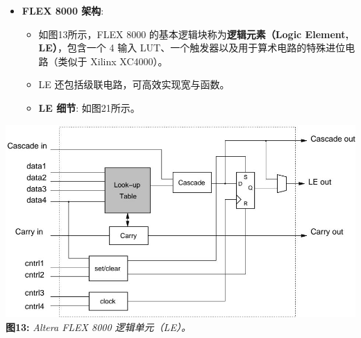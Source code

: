 \begin{frame}
\begin{itemize}
\tightlist
\item
    \textbf{FLEX 8000 架构}:

    \begin{itemize}
    \tightlist
    \item
    如图13所示，FLEX 8000 的基本逻辑块称为\textbf{逻辑元素（Logic
    Element, LE）}，包含一个 4 输入
    LUT、一个触发器以及用于算术电路的特殊进位电路（类似于 Xilinx
    XC4000）。
    \item
    LE 还包括级联电路，可高效实现宽与函数。
    \item
    \textbf{LE 细节}: 如图21所示。
    \end{itemize}
\end{itemize}

\includegraphics[keepaspectratio]{img1/FLEX800LE.jpeg}
\textbf{图13:} \emph{Altera FLEX 8000 逻辑单元（LE）。}
\end{frame}

